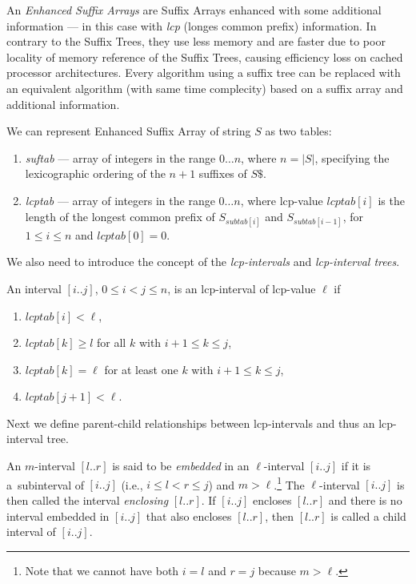 An \textit{Enhanced Suffix Arrays} are Suffix Arrays enhanced with some additional information --- in this case with \textit{lcp} (longes common prefix) information.
In contrary to the Suffix Trees, they use less memory and are faster due to poor locality of memory reference of the Suffix Trees, causing efficiency loss on cached processor architectures.
Every algorithm using a suffix tree can be replaced with an equivalent
algorithm (with same time complecity) based on a suffix array and additional information\cite{enhancedsuffixarrays}.

We can represent Enhanced Suffix Array of string $S$ as two tables:
\begin{enumerate}
  \item \textit{suftab} --- array of integers in the range $0\dots n$, where $n = |S|$, specifying the lexicographic ordering of the $n + 1$ suffixes of $S\$ $.
  \item \textit{lcptab} --- array of integers in the range $0\dots n$, where lcp-value $lcptab[i]$ is the length of the longest common prefix of $S_{subtab[i]}$ and $S_{subtab[i-1]}$, for $1 \leq i \leq n$ and $lcptab[0] = 0$.
\end{enumerate}

We also need to introduce the concept of the \textit{lcp-intervals} and \textit{lcp-interval trees}.
\begin{definition}
An interval $[i..j]$, $0 \leq i < j \leq n$, is an lcp-interval of lcp-value $\ell$ if

\begin{enumerate}
\item $lcptab[i] < \ell$,
\item $lcptab[k] \geq l$ for all $k$ with $i + 1 \leq k \leq j$,
\item $lcptab[k] = \ell$ for at least one $k$ with $i + 1 \leq k \leq j$,
\item $lcptab[j + 1] < \ell$.
\end{enumerate}
\cite{enhancedsuffixarrays}
\end{definition}

Next we define parent-child relationships between lcp-intervals and thus an lcp-interval tree.

\begin{definition}
  An $m$-interval $[l..r]$ is said to be \textit{embedded} in an $\ell$-interval $[i..j]$ if it is a~subinterval of $[i..j]$ (i.e., $i \leq l < r \leq j $) and $m > \ell$.\footnote{Note that we cannot have both $i = l$ and $r = j$ because $m > \ell$.}
  The $\ell$-interval $[i..j ]$ is then called the interval \textit{enclosing} $[l..r]$. If $[i..j]$ encloses $[l..r]$ and there is no interval embedded in $[i..j]$ that also encloses $[l..r]$, then $[l..r]$ is called a child interval of $[i..j]$.\cite{enhancedsuffixarrays}
\end{definition}

